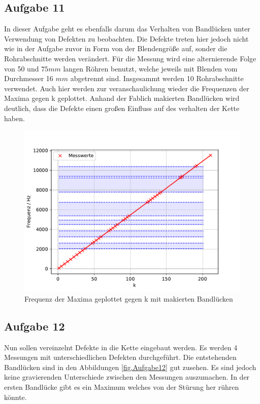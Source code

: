 \subsection{Aufgabe 11}
In dieser Aufgabe geht es ebenfalls darum das Verhalten von Bandlücken unter Verwendung von Defekten zu beobachten.
Die Defekte treten hier jedoch nicht wie in der Aufgabe zuvor in Form von der Blendengröße auf, sonder die Rohrabschnitte werden verändert.
Für die Messung wird eine alternierende Folge von 50 und $75\si{mm}$ langen Röhren benutzt, welche jeweils mit Blenden vom Durchmesser 16 $\si{mm}$ abgetrennt sind.
Insgesammt werden 10 Rohrabschnitte verwendet.
Auch hier werden zur veranschaulichung wieder die Frequenzen der Maxima gegen k geplottet.
Anhand der Fablich makierten Bandlücken wird deutlich, dass die Defekte einen großen Einfluss auf des verhalten der Kette haben.
\begin{figure}[h!]
  \centering
  \includegraphics[width=1\textwidth]{A112.pdf}
  \caption{Frequenz der Maxima geplottet gegen k mit makierten Bandlücken}
  \label{fig.Aufgabe111}
\end{figure}
\FloatBarrier

\subsection{Aufgabe 12}
Nun sollen vereinzelnt Defekte in die Kette eingebaut werden.
Es werden 4 Messungen mit unterschiedlichen Defekten durchgeführt.
Die entstehenden Bandlücken sind in den Abbildungen \ref{fig.Aufgabe12} gut zusehen.
Es sind jedoch keine gravierenden Unterschiede zwischen den Messungen auszumachen.
In der ersten Bandlücke gibt es ein Maximum welches von der Stürung her rühren könnte.

